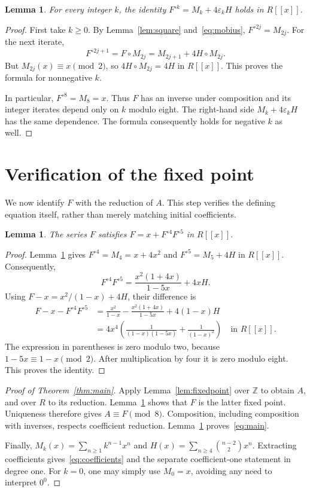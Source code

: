\documentclass[11pt]{article}
\newtheorem{lemma}[theorem]{Lemma}
\theoremstyle{remark}
\newcommand{\Z}{\mathbb Z}
\newcommand{\eps}{\varepsilon}
\newcommand{\itn}[2]{{#1}^{\circ #2}}
\begin{document}
\begin{lemma}\label{lem:iterates}
For every integer $k$, the identity
$\itn{F}{k}=M_k+4\eps_kH$ holds in $R[[x]]$.
\end{lemma}

\begin{proof}
First take $k\geq0$. By Lemma~\ref{lem:square} and~\eqref{eq:mobius},
$\itn{F}{2j}=M_{2j}$. For the next iterate,
\[
\itn{F}{2j+1}=F\circ M_{2j}
=M_{2j+1}+4H\circ M_{2j}.
\]
But $M_{2j}(x)\equiv x\pmod2$, so
$4H\circ M_{2j}=4H$ in $R[[x]]$. This proves the formula for
nonnegative $k$.

In particular, $\itn{F}{8}=M_8=x$. Thus $F$ has an inverse under
composition and its integer iterates depend only on $k$ modulo eight.
The right-hand side $M_k+4\eps_kH$ has the same dependence. The
formula consequently holds for negative $k$ as well.
\end{proof}

\section{Verification of the fixed point}

We now identify $F$ with the reduction of $A$. This step verifies the
defining equation itself, rather than merely matching initial coefficients.

\begin{lemma}\label{lem:equation}
The series $F$ satisfies $F=x+\itn{F}{4}\itn{F}{5}$ in $R[[x]]$.
\end{lemma}

\begin{proof}
Lemma~\ref{lem:iterates} gives
$\itn{F}{4}=M_4=x+4x^2$ and $\itn{F}{5}=M_5+4H$ in $R[[x]]$.
Consequently,
\[
\itn{F}{4}\itn{F}{5}
=\frac{x^2(1+4x)}{1-5x}+4xH.
\]
Using $F-x=x^2/(1-x)+4H$, their difference is
\begin{align*}
F-x-\itn{F}{4}\itn{F}{5}
&=\frac{x^2}{1-x}-\frac{x^2(1+4x)}{1-5x}+4(1-x)H\\
&=4x^4\left(\frac{1}{(1-x)(1-5x)}+
                    \frac{1}{(1-x)^2}\right)
\quad\text{in }R[[x]].
\end{align*}
The expression in parentheses is zero modulo two, because
$1-5x\equiv1-x\pmod2$. After multiplication by four it is zero
modulo eight. This proves the identity.
\end{proof}

\begin{proof}[Proof of Theorem~\ref{thm:main}]
Apply Lemma~\ref{lem:fixedpoint} over $\Z$ to obtain $A$, and over
$R$ to its reduction. Lemma~\ref{lem:equation} shows that $F$ is
the latter fixed point. Uniqueness therefore gives $A\equiv F\pmod8$.
Composition, including composition with inverses, respects coefficient
reduction. Lemma~\ref{lem:iterates} proves~\eqref{eq:main}.

Finally,
$M_k(x)=\sum_{n\geq1}k^{n-1}x^n$ and
$H(x)=\sum_{n\geq4}\binom{n-2}{2}x^n$.
Extracting coefficients gives~\eqref{eq:coefficients} and the separate
coefficient-one statement in degree one. For $k=0$, one may simply use
$M_0=x$, avoiding any need to interpret $0^0$.
\end{proof}
\end{document}
